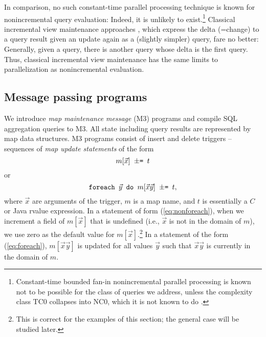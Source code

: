 In comparison, no such constant-time parallel processing technique
is known for nonincremental query
evaluation: Indeed, it is unlikely to exist.\footnote{Constant-time
bounded fan-in nonincremental
parallel processing is known not to be possible for
the class of queries we address,
unless the complexity class TC0 collapses into NC0, which it is not known
to do \cite{Joh90}.} Classical incremental view maintenance approaches
\cite{roussopoulos-tods:91,griffin-sigmod:95,colby-sigmod:96,yan-vldb:95,kotidis-tods:01,zhou-vldb:07}, which
express the delta (=change) to a query result given an update again
as a (slightly simpler) query, fare no better: Generally,
given a query, there is another query whose delta is the first query.
Thus, classical incremental view maintenance has the same limits to
parallelization as nonincremental evaluation.


\subsection{Message passing programs}


We introduce {\em map maintenance message}\/ (M3) programs and
compile SQL aggregation queries to M3.
All state including query results are represented by map data
structures. 
M3 programs consist of insert and delete triggers -- sequences
of {\em map update statements}\/ of the form
\begin{equation}
\mbox{{\tt $m[\vec{x}]$ $\pm$= $t$}}
\label{eq:nonforeach}
\end{equation}
or
\begin{equation}
\mbox{{\tt foreach $\vec{y}$ do $m[\vec{x}\vec{y}]$ $\pm$= $t$}},
\label{eq:foreach}
\end{equation}
where $\vec{x}$ are arguments of the trigger,
$m$ is a map name, and $t$ is essentially a $C$ or Java rvalue expression.
In a statement of form (\ref{eq:nonforeach}),
when we increment a field of $m[\vec{x}]$
that is undefined (i.e., $\vec{x}$ is not in the domain of $m$),
we use zero as the default value for $m[\vec{x}]$.\footnote{This is correct
for the examples of this section; the general case will be studied later.}
In a statement of the form (\ref{eq:foreach}),
$m[\vec{x}\vec{y}]$ is updated for all
values $\vec{y}$ such that $\vec{x}\vec{y}$ is currently in the
domain of $m$.


